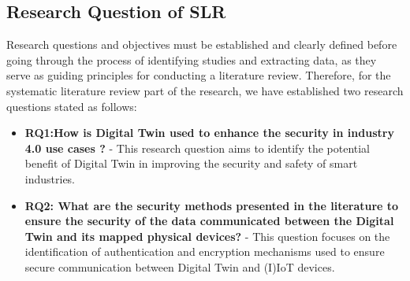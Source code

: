 
\subsection{Research Question of SLR}
Research questions and objectives must be established and clearly defined before going through the process of identifying studies and extracting data, as they serve as guiding principles for conducting a literature review\cite{carrera-rivera_how-conduct_2022}. Therefore, for the systematic literature review part of the research, we have established two research questions stated as follows:

\begin{itemize}

    \item \textbf{RQ1:How is Digital Twin used to enhance the security in industry 4.0 use cases ?} - This research question aims to identify the potential benefit of Digital Twin in improving the security and safety of smart industries.
 
    \item \textbf{RQ2: What are the security methods presented in the literature to ensure the security of the data communicated between the Digital Twin and its mapped physical devices?} - This question focuses on the identification of authentication and encryption mechanisms used to ensure secure communication between Digital Twin and (I)IoT devices.
\end{itemize}